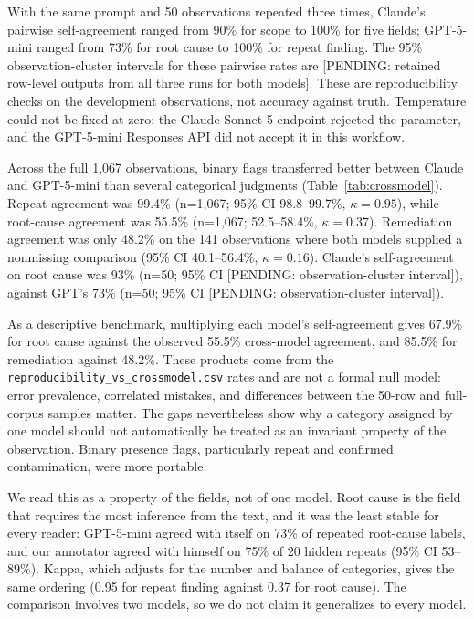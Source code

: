 \documentclass[12pt]{article}
\begin{document}


With the same prompt and 50 observations repeated three times, Claude's
pairwise self-agreement ranged from 90\% for scope to 100\% for five fields;
GPT-5-mini ranged from 73\% for root cause to 100\% for repeat finding.
The 95\% observation-cluster intervals for these pairwise rates are
[PENDING: retained row-level outputs from all three runs for both models].
These are reproducibility checks on the development observations, not
accuracy against truth. Temperature could not be fixed at zero: the
Claude Sonnet 5 endpoint rejected the parameter, and the GPT-5-mini
Responses API did not accept it in this workflow.

Across the full 1,067 observations, binary flags transferred better between
Claude and GPT-5-mini than several categorical judgments
(Table~\ref{tab:crossmodel}). Repeat agreement was 99.4\% (n=1,067;
95\% CI 98.8--99.7\%, $\kappa=0.95$), while root-cause agreement was
55.5\% (n=1,067; 52.5--58.4\%, $\kappa=0.37$). Remediation agreement
was only 48.2\% on the 141 observations where both models supplied a
nonmissing comparison (95\% CI 40.1--56.4\%, $\kappa=0.16$). Claude's
self-agreement on root cause was 93\% (n=50; 95\% CI [PENDING:
observation-cluster interval]), against GPT's 73\% (n=50; 95\% CI
[PENDING: observation-cluster interval]).



As a descriptive benchmark, multiplying each model's self-agreement gives
67.9\% for root cause against the observed 55.5\% cross-model agreement,
and 85.5\% for remediation against 48.2\%. These products come from the
\texttt{reproducibility\_vs\_crossmodel.csv} rates and are not a formal
null model: error prevalence, correlated mistakes, and differences between
the 50-row and full-corpus samples matter. The gaps nevertheless show why
a category assigned by one model should not automatically be treated as an
invariant property of the observation. Binary presence flags, particularly
repeat and confirmed contamination, were more portable.

We read this as a property of the fields, not of one model. Root cause is
the field that requires the most inference from the text, and it was the
least stable for every reader: GPT-5-mini agreed with itself on 73\% of
repeated root-cause labels, and our annotator agreed with himself on 75\%
of 20 hidden repeats (95\% CI 53--89\%). Kappa, which adjusts for the
number and balance of categories, gives the same ordering (0.95 for repeat
finding against 0.37 for root cause). The comparison involves two models,
so we do not claim it generalizes to every model.
\end{document}
